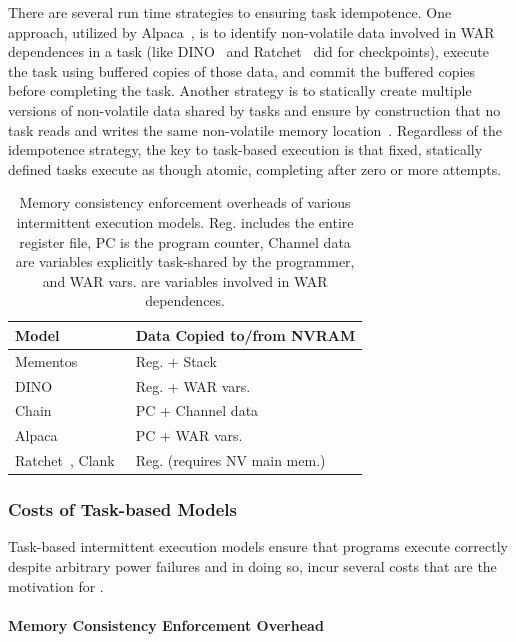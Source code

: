 There are several run time strategies to ensuring task idempotence. One
approach, utilized by Alpaca~\cite{alpaca}, is to identify non-volatile data
involved in WAR dependences in a task (like DINO~\cite{dino} and
Ratchet~\cite{rachet} did for checkpoints), execute the task using buffered
copies of those data, and commit the buffered copies before completing the
task. Another strategy is to statically create multiple versions of
non-volatile data shared by tasks and ensure by construction that no task reads
and writes the same non-volatile memory location~\cite{chain}. Regardless of
the idempotence strategy, the key to task-based execution is that fixed,
statically defined tasks execute as though atomic, completing after zero or
more attempts. 

\begin{table}
	\centering
	\footnotesize
	\begin{tabular}{l|l}
		Model & Data Copied to/from NVRAM\\
		\hline
		Mementos~\cite{mementos}                             & Reg. + Stack     \\
		DINO~\cite{dino}                                     & Reg. + WAR vars. \\
		Chain~\cite{chain}                                   & PC   + Channel data\\
		Alpaca~\cite{alpaca}                                 & PC   + WAR vars. \\
		Ratchet~\cite{ratchet}, Clank~\cite{hicks_isca_2017} & Reg. (requires NV main mem.)             \\
	\end{tabular}
	\caption{Memory consistency enforcement overheads of various intermittent execution models. Reg. includes the entire register file, PC is the program counter, Channel data are variables explicitly task-shared by the programmer, and WAR vars. are variables involved in WAR dependences.}
	\label{table:chechpoint_comparison}
\end{table}

\subsubsection{Costs of Task-based Models}

Task-based intermittent execution models ensure that programs execute correctly
despite arbitrary power failures and in doing so, incur several costs that are
the motivation for \sys. 

\paragraph{Memory Consistency Enforcement Overhead}

